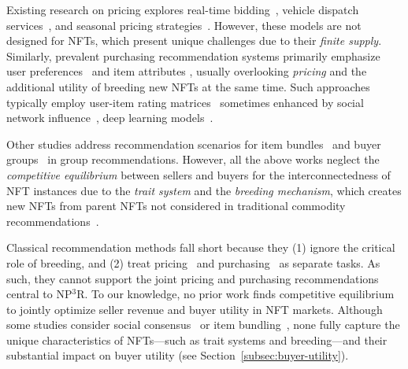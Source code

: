 \documentclass[conference]{IEEEtran}
\theoremstyle{plain}
\begin{document}
Existing research on pricing explores real-time bidding~\cite{ren2019deep, yang2021multi}, vehicle dispatch services~\cite{zheng2019auction, zhang2022multi}, and seasonal pricing strategies~\cite{zhu2022modeling}. However, these models are not designed for NFTs, which present unique challenges due to their \textit{finite supply}. Similarly, prevalent purchasing recommendation systems primarily emphasize user preferences~\cite{chen2019personalized} and item attributes \cite{zhang2019deep}, usually overlooking \textit{pricing} and the additional utility of breeding new NFTs at the same time. Such approaches typically employ user-item rating matrices~\cite{koren2009matrix, he2020lightgcn} sometimes enhanced by social network influence~\cite{zhou2017enhancing, zhou2019real, yang2021consisrec},  deep learning models~\cite{he2020lightgcn, yang2021consisrec}. 

Other studies address recommendation scenarios for item bundles~\cite{zhu2014bundle, chang2020bundle} and buyer groups~\cite{cao2018attentive, zhang2017item, xiao2017fairness} in group recommendations. However, all the above works neglect the \textit{competitive equilibrium} between sellers and buyers for the interconnectedness of NFT instances due to the \emph{trait system} and the \emph{breeding mechanism}, which creates new NFTs from parent NFTs not considered in traditional commodity recommendations~\cite{he2020lightgcn, yang2021consisrec, chang2020bundle, cao2018attentive}. 

Classical recommendation methods fall short because they (1) ignore the critical role of breeding, and (2) treat pricing~\cite{zhang2022multi, zhu2022modeling} and purchasing~\cite{he2020lightgcn, yang2021consisrec} as separate tasks. As such, they cannot support the joint pricing and purchasing recommendations central to NP$^3$R\xspace. To our knowledge, no prior work finds competitive equilibrium to jointly optimize seller revenue and buyer utility in NFT markets. Although some studies consider social consensus~\cite{zhang2017item, xiao2017fairness} or item bundling~\cite{chang2020bundle}, none fully capture the unique characteristics of NFTs—such as trait systems and breeding—and their substantial impact on buyer utility (see Section~\ref{subsec:buyer-utility}).
\end{document}
